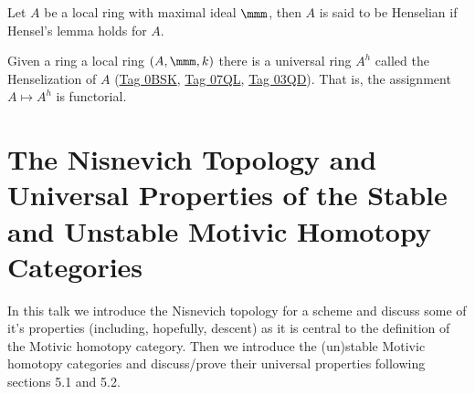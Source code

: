 \documentclass[12pt]{article}
\numberwithin{equation}{section}
\numberwithin{lemma}{section}
\numberwithin{theorem}{section}
\numberwithin{proposition}{section}
\numberwithin{corollary}{section}
\numberwithin{definition}{section}
\numberwithin{example}{section}
\numberwithin{remark}{section}
\begin{document}
\begin{definition}
  Let $A$ be a local ring with maximal ideal $\mmm$, then $A$ is said
  to be Henselian if Hensel's lemma holds for $A$.
\end{definition}

Given a ring a local ring $(A, \mmm, k)$ there is a universal ring
$A^{h}$ called the Henselization of $A$
(\href{https://stacks.math.columbia.edu/tag/0BSK}{Tag 0BSK},
\href{https://stacks.math.columbia.edu/tag/07QL}{Tag 07QL},
\href{https://stacks.math.columbia.edu/tag/03QD}{Tag 03QD}). That is,
the assignment $A \mapsto A^{h}$ is functorial.


\section{The Nisnevich Topology and Universal Properties of the Stable
  and Unstable Motivic Homotopy Categories}

In this talk we introduce the Nisnevich topology for a scheme and
discuss some of it's properties (including, hopefully, descent) as it
is central to the definition of the Motivic homotopy category. Then we
introduce the (un)stable Motivic homotopy categories and discuss/prove
their universal properties following~\cite{robalo2012noncommutative}
sections 5.1 and 5.2.

\end{document}
